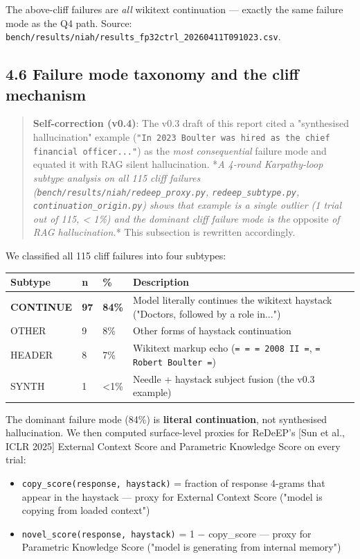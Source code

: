 \documentclass[11pt]{article}
\begin{document}
The above-cliff failures are \textit{all} wikitext continuation — exactly the same failure mode as the Q4 path. Source: \texttt{bench/results/niah/results\_fp32ctrl\_20260411T091023.csv}.


\subsection*{4.6 Failure mode taxonomy and the cliff mechanism}


\begin{quote}
\textbf{Self-correction (v0.4)}: The v0.3 draft of this report cited a "synthesised hallucination" example (\texttt{"In 2023 Boulter was hired as the chief financial officer..."}) as the \textit{most consequential} failure mode and equated it with RAG silent hallucination. *\textit{A 4-round Karpathy-loop subtype analysis on all 115 cliff failures (\texttt{bench/results/niah/redeep\_proxy.py}, \texttt{redeep\_subtype.py}, \texttt{continuation\_origin.py}) shows that example is a single outlier (1 trial out of 115, < 1\%) and the dominant cliff failure mode is the }opposite\textit{ of RAG hallucination.}* This subsection is rewritten accordingly.
\end{quote}


We classified all 115 cliff failures into four subtypes:


\begin{center}
\begin{tabular}{llll}
\toprule
Subtype & n & \% & Description \\
\midrule
\textbf{CONTINUE} & \textbf{97} & \textbf{84\%} & Model literally continues the wikitext haystack ("Doctors, followed by a role in...") \\
OTHER & 9 & 8\% & Other forms of haystack continuation \\
HEADER & 8 & 7\% & Wikitext markup echo (\texttt{= = = 2008 II =}, \texttt{= Robert Boulter =}) \\
SYNTH & 1 & <1\% & Needle + haystack subject fusion (the v0.3 example) \\
\bottomrule
\end{tabular}
\end{center}


The dominant failure mode (84\%) is \textbf{literal continuation}, not synthesised hallucination. We then computed surface-level proxies for ReDeEP's [Sun et al., ICLR 2025] External Context Score and Parametric Knowledge Score on every trial:


\begin{itemize}
\item \texttt{copy\_score(response, haystack)} = fraction of response 4-grams that appear in the haystack — proxy for External Context Score ("model is copying from loaded context")
\item \texttt{novel\_score(response, haystack)} = 1 − copy\_score — proxy for Parametric Knowledge Score ("model is generating from internal memory")
\end{itemize}
\end{document}
